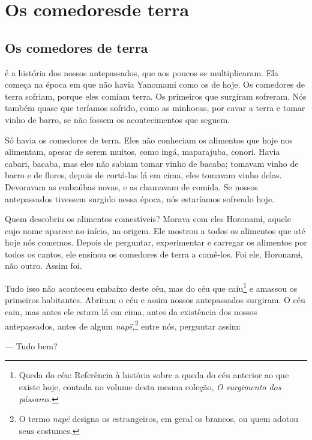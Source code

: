 
\part[Os comedores de terra]{Os comedores\break de terra}

\chapter{Os comedores de terra}

 é a história dos nossos antepassados, que aos poucos se
multiplicaram. Ela começa na época em que não havia Yanomami como os de
hoje. Os comedores de terra sofriam, porque eles comiam terra. Os
primeiros que surgiram sofreram. Nós também quase que teríamos sofrido,
como as minhocas, por cavar a terra e tomar vinho de barro, se não
fossem os acontecimentos que seguem.	

Só havia os comedores de terra. Eles não conheciam os alimentos que hoje
 nos alimentam, apesar de serem muitos, como ingá, maparajuba,
 conori. Havia cabari, bacaba, mas eles não sabiam tomar vinho de
 bacaba; tomavam vinho de barro e de flores, depois de cortá-las lá em
 cima, eles tomavam vinho delas. Devoravam as embaúbas novas, e as
 chamavam de comida. Se nossos antepassados tivessem surgido nessa época,
 nós estaríamos sofrendo hoje. 

Quem descobriu os alimentos comestíveis? Morava com eles Horonamɨ,
aquele cujo nome aparece no início, na origem. Ele mostrou a todos os
alimentos que até hoje nós comemos. Depois de perguntar, experimentar e
carregar os alimentos por todos os cantos, ele ensinou os comedores de
terra a comê-los. Foi ele, Horonamɨ, não outro. Assim foi.

Tudo isso não aconteceu embaixo deste céu, mas do céu que caiu\footnote{Queda do céu: Referência à história sobre a queda do céu anterior ao que existe hoje, contada no volume desta mesma coleção, \textit{O surgimento dos pássaros}.} e amassou
os primeiros habitantes. Abriram o céu e assim nossos antepassados
surgiram. O céu caiu, mas antes ele estava lá em cima, antes da
existência dos nossos antepassados, antes de algum \textit{napë},\footnote{O termo \textit{napë} designa os estrangeiros, em geral os brancos, ou quem adotou seus costumes.} entre
nós, perguntar assim:

--- Tudo bem? 


